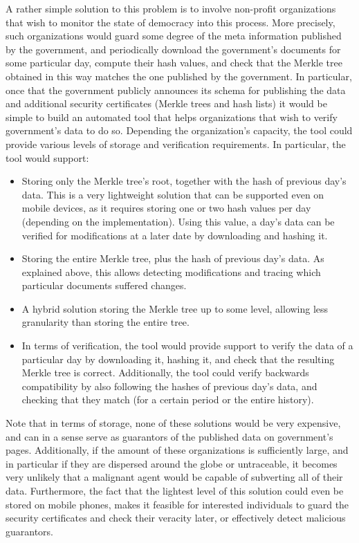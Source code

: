 A rather simple solution to this problem is to involve non-profit organizations that wish to monitor the state of democracy into this process. More precisely, such organizations would guard some degree of the meta information published by the government, and periodically download the government's documents for some particular day, compute their hash values, and check that the Merkle tree obtained in this way matches the one published by the government. In particular, once that the government publicly announces its schema for publishing the data and additional security certificates (Merkle trees and hash lists) it would be simple to build an automated tool that helps organizations that wish to verify government's data to do so. Depending the organization's capacity, the tool could provide various levels of storage and verification requirements. In particular, the tool would support:
\begin{itemize}
\item Storing only the Merkle tree's root, together with the hash of previous day's data. This is a very lightweight solution that can be supported even on mobile devices, as it requires storing one or two hash values per day (depending on the implementation). Using this value, a day's data can be verified for modifications at a later date by downloading and hashing it.
\item Storing the entire Merkle tree, plus the hash of previous day's data. As explained above, this allows detecting modifications and tracing which particular documents suffered changes.
\item A hybrid solution storing the Merkle tree up to some level, allowing less granularity than storing the entire tree.
\item In terms of verification, the tool would provide support to verify the data of a particular day by downloading it, hashing it, and check that the resulting Merkle tree is correct. Additionally, the tool could verify backwards compatibility by also following the hashes of previous day's data, and checking that they match (for a certain period or the entire history).
\end{itemize}

Note that in terms of storage, none of these solutions would be very expensive, and can in a sense serve as guarantors of the published data on government's pages. Additionally, if the amount of these organizations is sufficiently large, and in particular if they are dispersed around the globe or untraceable, it becomes very unlikely that a malignant agent would be capable of subverting all of their data. Furthermore, the fact that the lightest level of this solution could even be stored on mobile phones, makes it feasible for interested individuals to guard the security certificates and check their veracity later, or effectively detect malicious guarantors.